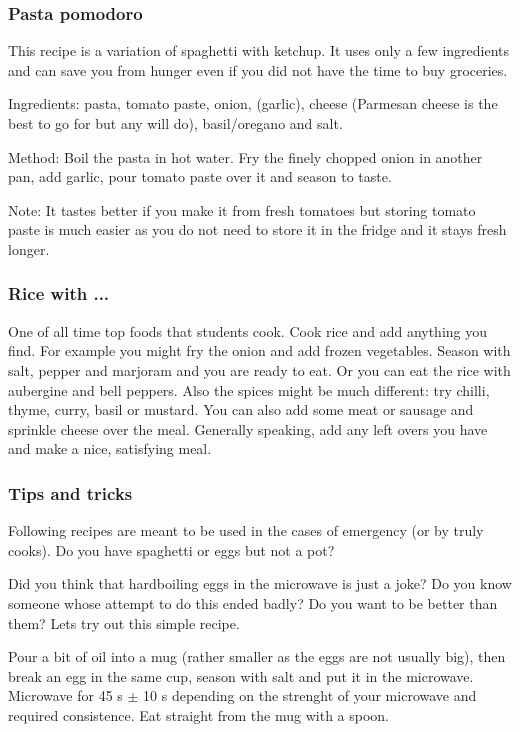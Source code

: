 \subsubsection*{Pasta pomodoro}
This recipe is a variation of spaghetti with ketchup. It uses only a few
ingredients and can save you from hunger even if you did not have the time to
buy groceries.

Ingredients: pasta, tomato paste, onion, (garlic), cheese (Parmesan cheese is
the best to go for but any will do), basil/oregano and salt.

Method: Boil the pasta in hot water. Fry the finely chopped onion in another
pan, add garlic, pour tomato paste over it and season to taste.

Note: It tastes better if you make it from fresh tomatoes but storing tomato
paste is much easier as you do not need to store it in the fridge and it stays
fresh longer.


\subsubsection*{Rice with ...}
One of all time top foods that students cook. Cook rice and add anything you
find.
For example you might fry the onion and add frozen vegetables. Season with salt,
pepper and marjoram and you are ready to eat. Or you can eat the rice with
aubergine and bell peppers.
Also the spices might be much different: try chilli, thyme, curry, basil or
mustard. You can also add some meat or sausage and sprinkle cheese over the
meal.
Generally speaking, add any left overs you have and make a nice, satisfying
meal.


\subsubsection*{Tips and tricks}
Following recipes are meant to be used in the cases of emergency (or by truly
 cooks). Do you have spaghetti or eggs but not a pot?

Did you think that hardboiling eggs in the microwave is just a joke? Do you know
someone whose attempt to do this ended badly? Do you want to be better than
them? Lets try out this simple recipe.

Pour a bit of oil into a mug (rather smaller as the eggs are not usually big),
then break an egg in the same cup, season with salt and put it in the microwave.
Microwave for 45 s $\pm$ 10 s depending on the strenght of your microwave and
required consistence. Eat straight from the mug with a spoon.


